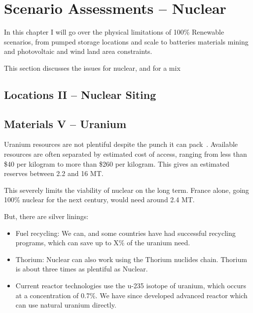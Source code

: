 \setchapterpreamble[u]{\margintoc}
\chapter{Scenario Assessments -- Nuclear}

In this chapter I will go over the physical limitations of 100\% Renewable scenarios, from pumped storage locations and scale to batteries materials mining and photovoltaic and wind land area constraints.

This section discusses the issues for nuclear, and for a mix

\section{Locations II -- Nuclear Siting}

\blindtext

\section{Materials V -- Uranium}

Uranium resources are not plentiful despite the punch it can pack~. Available resources are often separated by estimated cost of access, ranging from less than \$40 per kilogram to more than \$260 per kilogram. This gives an estimated reserves between 2.2 and 16 MT.

This severely limits the viability of nuclear on the long term. France alone, going 100\% nuclear for the next century, would need around 2.4 MT.

But, there are silver linings:

\begin{itemize}
\item Fuel recycling: We can, and some countries have had successful recycling programs, which can save up to X\% of the uranium need.
\item Thorium: Nuclear can also work using the Thorium nuclides chain. Thorium is about three times as plentiful as Nuclear.
\item Current reactor technologies use the u-235 isotope of uranium, which occurs at a concentration of 0.7\%. We have since developed advanced reactor which can use natural uranium directly.
\end{itemize}

